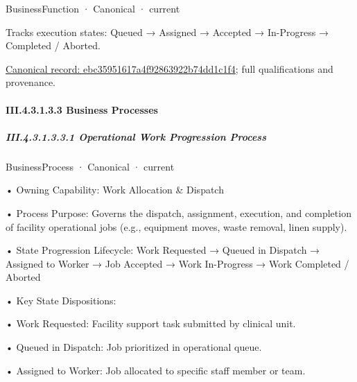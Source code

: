 \label{element:ebc35951617a4f92863922b74dd1c1f4}
{\small BusinessFunction · Canonical · current}\par

Tracks execution states: Queued → Assigned → Accepted → In-Progress → Completed / Aborted.


{\footnotesize \href{../../../../../../../../continuum/business/business-function/ebc35951617a4f92863922b74dd1c1f4.md}{Canonical record: ebc35951617a4f92863922b74dd1c1f4}; full qualifications and provenance.}\par
\paragraph*{III.4.3.1.3.3 Business Processes}
\label{navigation:III.4.3.1.3.3}

\subparagraph*{III.4.3.1.3.3.1 Operational Work Progression Process}
\label{navigation:III.4.3.1.3.3.1}

\label{element:5ebba522194b4de5a5b3963e855d712d}
{\small BusinessProcess · Canonical · current}\par

•
Owning Capability: Work Allocation \& Dispatch



•
Process Purpose: Governs the dispatch, assignment, execution, and completion of facility operational jobs (e.g., equipment moves, waste removal, linen supply).



•
State Progression Lifecycle: Work Requested → Queued in Dispatch → Assigned to Worker → Job Accepted → Work In-Progress → Work Completed / Aborted



•
Key State Dispositions:



•
Work Requested: Facility support task submitted by clinical unit.



•
Queued in Dispatch: Job prioritized in operational queue.



•
Assigned to Worker: Job allocated to specific staff member or team.




